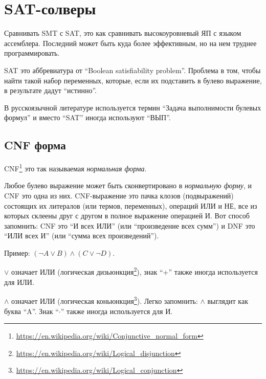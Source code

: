 \section{\ac{SAT}-солверы}

Сравнивать SMT с SAT, это как сравнивать высокоуровневый ЯП с языком ассемблера.
Последний может быть куда более эффективным, но на нем труднее программировать.

SAT это аббревиатура от ``Boolean satisfiability problem''.
Проблема в том, чтобы найти такой набор переменных, которые, если их подставить в булево выражение, в результате
дадут ``истинно''.

В русскоязычной литературе используется термин ``Задача выполнимости булевых формул'' и вместо ``SAT'' иногда используют ``ВЫП''.

\subsection{CNF форма}

\ac{CNF}\footnote{\url{https://en.wikipedia.org/wiki/Conjunctive_normal_form}} это так называемая \textit{нормальная форма}.


Любое булево выражение может быть сконвертировано в \textit{нормальную форму}, и \ac{CNF} это одна из них.
\ac{CNF}-выражение это пачка клозов (подвыражений) состоящих их литералов (или термов, переменных), операций ИЛИ и НЕ,
все из которых склеены друг с другом в полное выражение операцией И.
Вот способ запомнить: \ac{CNF} это ``И всех ИЛИ'' (или ``произведение всех сумм'')
и \ac{DNF} это ``ИЛИ всех И'' (или ``сумма всех произведений'').

Пример: $(\neg A \vee B) \wedge (C \vee \neg D)$.

$\vee$ означает ИЛИ (логическая дизьюнкция\footnote{\url{https://en.wikipedia.org/wiki/Logical_disjunction}}), 
знак ``+'' также иногда используется для ИЛИ.

$\wedge$ означает ИЛИ (логическая коньюнкция\footnote{\url{https://en.wikipedia.org/wiki/Logical_conjunction}}).
Легко запомнить: $\wedge$ выглядит как буква ``A''.
Знак ``$\cdot$'' также иногда используется для И.

